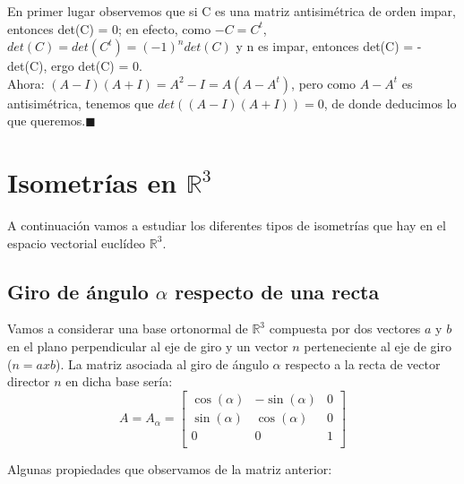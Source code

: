 \documentclass[10pt,a4paper]{article}
\theoremstyle{mystyle}
\begin{document}
En primer lugar observemos que si C es una matriz antisimétrica de orden impar, entonces det(C) = 0; en efecto, como $-C = C^t$, $det(C) = det(C^t) = (-1)^ndet(C)$ y n es impar, entonces det(C) = -det(C), ergo det(C) = 0.\\

Ahora: $(A-I)(A+I) = A^2 - I = A(A - A^t)$, pero como $A-A^t$ es antisimétrica, tenemos que $det((A-I)(A+I)) = 0$, de donde deducimos lo que queremos.$\blacksquare$\\

\section{Isometrías en $\mathbb{R}^3$}

A continuación vamos a estudiar los diferentes tipos de isometrías que hay en el espacio vectorial euclídeo $\mathbb{R}^3$.\\

\subsection{Giro de ángulo $\alpha$ respecto de una recta}

Vamos a considerar una base ortonormal de $\mathbb{R}^3$ compuesta por dos vectores $a$ y $b$ en el plano perpendicular al eje de giro y un vector $n$ perteneciente al eje de giro ($n = axb$). La matriz asociada al giro de ángulo $\alpha$ respecto a la recta de vector director $n$ en dicha base sería:\\

\[
A=A_{\alpha}=
\begin{bmatrix}
\cos(\alpha) & -\sin(\alpha) & 0 \\
\sin(\alpha) &  \cos(\alpha)  & 0 \\
0 & 0 & 1 \\
\end{bmatrix}
\]


Algunas propiedades que observamos de la matriz anterior:\\ 
\end{document}
